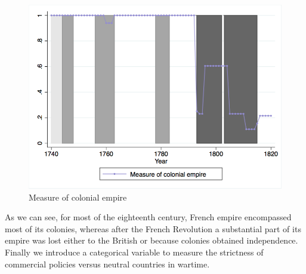 \documentclass[12pt,a4paper,notitlepage,english]{article}
\begin{document}
\begin{center}
\begin{figure}[H]
\caption{Measure of colonial empire}
\label{colony_loss}
\includegraphics[scale=.51]{colony_loss.png}
\end{figure}
\end{center}
As we can see, for most of the eighteenth century, French empire encompassed most of its colonies, whereas after the French Revolution a substantial part of its empire was lost either to the British or because colonies obtained independence. \\
Finally we introduce a categorical variable to measure the strictness of commercial policies versus neutral countries in wartime. 
\end{document}
